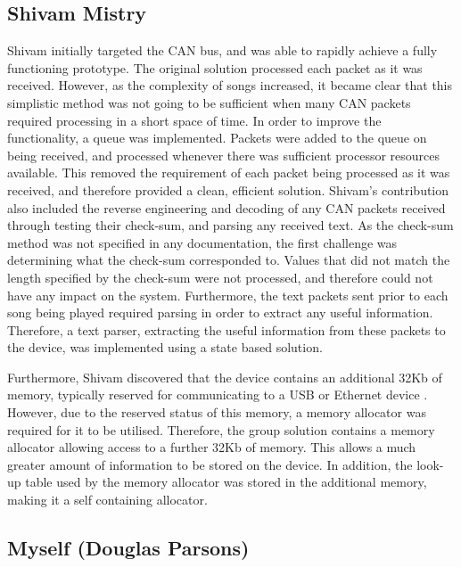 \subsection*{Shivam Mistry}
Shivam initially targeted the CAN bus, and was able to rapidly achieve a fully 
functioning prototype. The original solution processed each packet as it was 
received. However, as the complexity of songs increased, it became clear that this 
simplistic method was not going to be sufficient when many CAN packets required
processing in a short space of time.
In order to improve the functionality, a queue was implemented. Packets were 
added to the queue on being received, and processed whenever there was sufficient
processor resources available.
This removed the requirement of each packet being processed as it was received,
 and therefore provided a clean, efficient solution.
Shivam's contribution also included the reverse engineering and decoding of any
 CAN packets received through testing their check-sum, and parsing any received 
text.
As the check-sum method was not specified in any documentation, the first 
challenge was determining what the check-sum corresponded to. Values that did 
not match the length specified by the check-sum were not processed, and therefore 
could not have any impact on the system. Furthermore, the text packets sent prior 
to each song being played required parsing in order to extract any useful 
information. Therefore, a text parser, extracting the useful information from 
these packets to the device, was implemented using a state based solution. 
\par\bigskip\noindent
Furthermore, Shivam 
discovered that the device contains an additional 32Kb of memory, 
typically reserved for communicating to a USB or Ethernet device \cite{lpc1768-datasheet}.
However, due to the reserved status of this memory, a memory allocator was 
required for it to be utilised. 
Therefore, the group solution contains a memory allocator allowing access to 
a further 32Kb of memory. This allows a much greater amount of information to be 
stored on the device. 
In addition, the look-up table used by the memory allocator was stored in the 
additional memory, making it a self containing allocator. 

\subsection*{Myself (Douglas Parsons)}

